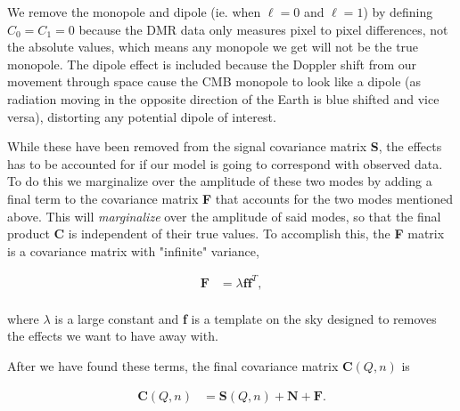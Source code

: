 \documentclass{emulateapj}
\begin{document}
\noindent
We remove the monopole and dipole (ie. when $\ell = 0$ and $\ell = 1$) by defining $C_0 = C_1 = 0$ because the DMR data only measures pixel to pixel differences, not the absolute values, which means any monopole we get will not be the true monopole. The dipole effect is included because the Doppler shift from our movement through space cause the CMB monopole to look like a dipole (as radiation moving in the opposite direction of the Earth is blue shifted and vice versa), distorting any potential dipole of interest.
 
While these have been removed from the signal covariance matrix \textbf{S}, the effects has to be accounted for if our model is going to correspond with observed data. To do this we marginalize over the amplitude of these two modes by adding a final term to the covariance matrix \textbf{F} that accounts for the two modes mentioned above. This will \textit{marginalize} over the amplitude of said modes, so that the final product \textbf{C} is independent of their true values. To accomplish this, the \textbf{F} matrix is a covariance matrix with "infinite" variance,


\begin{equation}
\label{F_cov}
\begin{array}{rl}
\textbf{F} &= \lambda \textbf{ff}^T,   \\ 
\end{array}
\end{equation}
 
\noindent
where $\lambda$ is a large constant and \textbf{f} is a template on the sky designed to removes the effects we want to have away with.
 
  
After we have found these terms, the final covariance matrix $\textbf{C}(Q, n)$ is
 
\begin{equation}
\label{C_cov}
   \begin{array}{rl}
    \textbf{C}(Q, n) &= \textbf{S}(Q, n) + \textbf{N} + \textbf{F}.  \\ 
 \end{array}
\end{equation}
\end{document}
